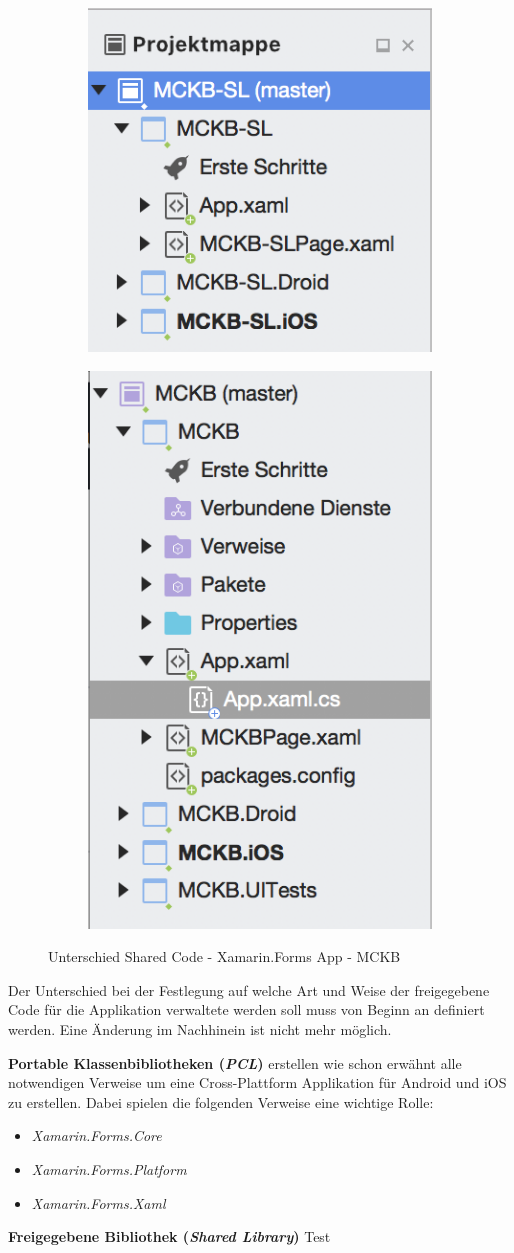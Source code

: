 	\newpage
	\begin{figure}[h!]
		\centering
		\begin{subfigure}
			\centering
			\includegraphics[width=.3\textwidth]{images/xamarin-shared-library.png}
		\end{subfigure}
		\begin{subfigure}
			\centering
			\includegraphics[width=.3\textwidth]{images/xamarin-portable-class.png}
		\end{subfigure}
		\caption{Unterschied Shared Code - Xamarin.Forms App - MCKB}
		\label{fig:xamarinsharedcode}
	\end{figure}

	Der Unterschied bei der Festlegung auf welche Art und Weise der freigegebene Code für die Applikation verwaltete werden soll muss von Beginn an definiert werden. Eine Änderung im Nachhinein ist nicht mehr möglich.

	\textbf{Portable Klassenbibliotheken (\textit{PCL})} erstellen wie schon erwähnt alle notwendigen Verweise um eine Cross-Plattform Applikation für Android und iOS zu erstellen. Dabei spielen die folgenden Verweise eine wichtige Rolle:
	\begin{itemize}
		\setlength\itemsep{0em}
		\item \textit{Xamarin.Forms.Core}
		\item \textit{Xamarin.Forms.Platform}
		\item \textit{Xamarin.Forms.Xaml}
	\end{itemize}

	\textbf{Freigegebene Bibliothek (\textit{Shared Library})} Test
























